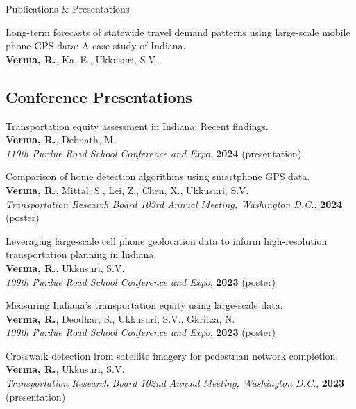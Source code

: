 \documentclass{CV} %
\begin{document}
\begin{rSection}{Publications \& Presentations}
\begin{etaremune}
        \item Long-term forecasts of statewide travel demand patterns using large-scale mobile phone GPS data: A case study of Indiana.
        \\ \textbf{Verma, R.}, Ka, E., Ukkusuri, S.V.
    \end{etaremune}

    \subsection*{Conference Presentations}
    \begin{etaremune}
        \item Transportation equity assessment in Indiana: Recent findings.
        \\ \textbf{Verma, R.}, Debnath, M.
        \\ \textit{110th Purdue Road School Conference and Expo}, \textbf{2024} (presentation)

        \item Comparison of home detection algorithms using smartphone GPS data.
        \\ \textbf{Verma, R.}, Mittal, S., Lei, Z., Chen, X., Ukkusuri, S.V.
        \\ \textit{Transportation Research Board 103rd Annual Meeting, Washington D.C.}, \textbf{2024} (poster)

        \item Leveraging large-scale cell phone geolocation data to inform high-resolution transportation planning in Indiana.
        \\ \textbf{Verma, R.}, Ukkusuri, S.V.
        \\ \textit{109th Purdue Road School Conference and Expo}, \textbf{2023} (poster)

        \item Measuring Indiana's transportation equity using large-scale data.
        \\ \textbf{Verma, R.}, Deodhar, S., Ukkusuri, S.V., Gkritza, N.
        \\ \textit{109th Purdue Road School Conference and Expo}, \textbf{2023} (poster)

        \item Crosswalk detection from satellite imagery for pedestrian network completion.
        \\ \textbf{Verma, R.}, Ukkusuri, S.V.
        \\ \textit{Transportation Research Board 102nd Annual Meeting, Washington D.C.}, \textbf{2023} (presentation)


\end{etaremune}
\end{rSection}
\end{document}
